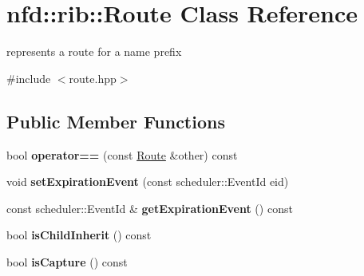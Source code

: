 \hypertarget{classnfd_1_1rib_1_1Route}{}\section{nfd\+:\+:rib\+:\+:Route Class Reference}
\label{classnfd_1_1rib_1_1Route}


represents a route for a name prefix  




{\ttfamily \#include $<$route.\+hpp$>$}

\subsection*{Public Member Functions}
\begin{DoxyCompactItemize}
\item 
bool {\bfseries operator==} (const \hyperlink{classnfd_1_1rib_1_1Route}{Route} \&other) const\hypertarget{classnfd_1_1rib_1_1Route_abd68db1116477eb87087e255c3773cc5}{}\label{classnfd_1_1rib_1_1Route_abd68db1116477eb87087e255c3773cc5}

\item 
void {\bfseries set\+Expiration\+Event} (const scheduler\+::\+Event\+Id eid)\hypertarget{classnfd_1_1rib_1_1Route_ab0a70dbdc1f6001e95e8fd8942440c10}{}\label{classnfd_1_1rib_1_1Route_ab0a70dbdc1f6001e95e8fd8942440c10}

\item 
const scheduler\+::\+Event\+Id \& {\bfseries get\+Expiration\+Event} () const\hypertarget{classnfd_1_1rib_1_1Route_ad9a1fdac16dab33eb69321bad3c89bba}{}\label{classnfd_1_1rib_1_1Route_ad9a1fdac16dab33eb69321bad3c89bba}

\item 
bool {\bfseries is\+Child\+Inherit} () const\hypertarget{classnfd_1_1rib_1_1Route_a6b256b3314160b037335c62271cd9a97}{}\label{classnfd_1_1rib_1_1Route_a6b256b3314160b037335c62271cd9a97}

\item 
bool {\bfseries is\+Capture} () const\hypertarget{classnfd_1_1rib_1_1Route_a67f9bc988becf66dfa07e0dadee85653}{}\label{classnfd_1_1rib_1_1Route_a67f9bc988becf66dfa07e0dadee85653}

\end{DoxyCompactItemize}
